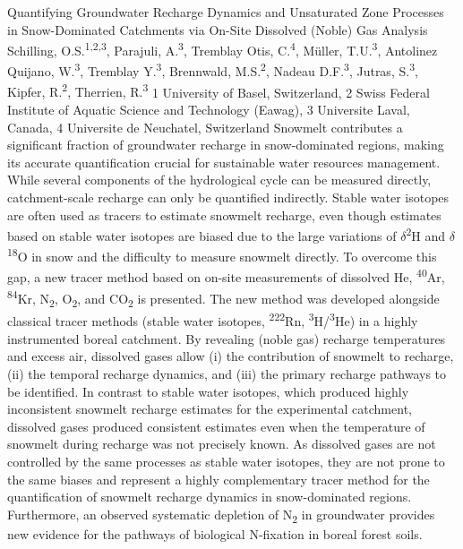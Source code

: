 \begin{conf-abstract}
{Quantifying Groundwater Recharge Dynamics and Unsaturated Zone Processes in Snow-Dominated Catchments via On-Site Dissolved (Noble) Gas Analysis}
{Schilling, O.S.\textsuperscript{1,2,3}, Parajuli, A.\textsuperscript{3}, Tremblay Otis, C.\textsuperscript{4}, Müller, T.U.\textsuperscript{3}, Antolinez Quijano, W.\textsuperscript{3}, Tremblay Y.\textsuperscript{3}, Brennwald, M.S.\textsuperscript{2}, Nadeau D.F.\textsuperscript{3}, Jutras, S.\textsuperscript{3}, Kipfer, R.\textsuperscript{2}, Therrien, R.\textsuperscript{3}}
{1 University of Basel, Switzerland, 2 Swiss Federal Institute of Aquatic Science and Technology (Eawag), 3 Universite Laval, Canada, 4 Universite de Neuchatel, Switzerland}
{Snowmelt contributes a significant fraction of groundwater recharge in snow-dominated regions, making its accurate quantification crucial for sustainable water resources management. While several components of the hydrological cycle can be measured directly, catchment-scale recharge can only be quantified indirectly. Stable water isotopes are often used as tracers to estimate snowmelt recharge, even though estimates based on stable water isotopes are biased due to the large variations of $\delta$\textsuperscript{2}H and $\delta$\textsuperscript{18}O in snow and the difficulty to measure snowmelt directly. To overcome this gap, a new tracer method based on on-site measurements of dissolved He, \textsuperscript{40}Ar, \textsuperscript{84}Kr, N\textsubscript{2}, O\textsubscript{2}, and CO\textsubscript{2} is presented. The new method was developed alongside classical tracer methods (stable water isotopes, \textsuperscript{222}Rn, \textsuperscript{3}H/\textsuperscript{3}He) in a highly instrumented boreal catchment. By revealing (noble gas) recharge temperatures and excess air, dissolved gases allow (i) the contribution of snowmelt to recharge, (ii) the temporal recharge dynamics, and (iii) the primary recharge pathways to be identified. In contrast to stable water isotopes, which produced highly inconsistent snowmelt recharge estimates for the experimental catchment, dissolved gases produced consistent estimates even when the temperature of snowmelt during recharge was not precisely known. As dissolved gases are not controlled by the same processes as stable water isotopes, they are not prone to the same biases and represent a highly complementary tracer method for the quantification of snowmelt recharge dynamics in snow-dominated regions. Furthermore, an observed systematic depletion of N\textsubscript{2} in groundwater provides new evidence for the pathways of biological N-fixation in boreal forest soils.}
\end{conf-abstract}
